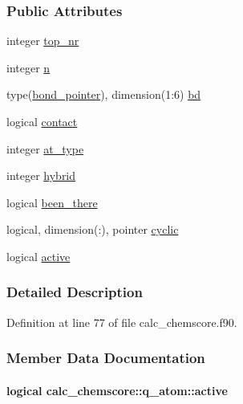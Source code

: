 \subsubsection*{Public Attributes}
\begin{DoxyCompactItemize}
\item 
integer \hyperlink{structcalc__chemscore_1_1q__atom_a45781d30e4d6635063993f5cc255f0d5}{top\-\_\-nr}
\item 
integer \hyperlink{structcalc__chemscore_1_1q__atom_a278aca77377ccabcd177be060a8a4c44}{n}
\item 
type(\hyperlink{structcalc__chemscore_1_1bond__pointer}{bond\-\_\-pointer}), dimension(1\-:6) \hyperlink{structcalc__chemscore_1_1q__atom_ab8271d5ededd6c275ae76897c65a1655}{bd}
\item 
logical \hyperlink{structcalc__chemscore_1_1q__atom_aa8b0c72fdf2f0bb5c4485f5af46abbfc}{contact}
\item 
integer \hyperlink{structcalc__chemscore_1_1q__atom_a53f533a342d764a9ed38a4e5929bdb70}{at\-\_\-type}
\item 
integer \hyperlink{structcalc__chemscore_1_1q__atom_a88f13993f1131b735ed1b57383871484}{hybrid}
\item 
logical \hyperlink{structcalc__chemscore_1_1q__atom_af47778363b2675c3ccb7992cafd5b448}{been\-\_\-there}
\item 
logical, dimension(\-:), pointer \hyperlink{structcalc__chemscore_1_1q__atom_aae893d503a84fb04f0063651d4b32012}{cyclic}
\item 
logical \hyperlink{structcalc__chemscore_1_1q__atom_a8ea40a20405d4aa8b1b03cf478d985da}{active}
\end{DoxyCompactItemize}


\subsubsection{Detailed Description}


Definition at line 77 of file calc\-\_\-chemscore.\-f90.



\subsubsection{Member Data Documentation}
\hypertarget{structcalc__chemscore_1_1q__atom_a8ea40a20405d4aa8b1b03cf478d985da}{
\paragraph[{active}]{\setlength{\rightskip}{0pt plus 5cm}logical calc\-\_\-chemscore\-::q\-\_\-atom\-::active}}\label{structcalc__chemscore_1_1q__atom_a8ea40a20405d4aa8b1b03cf478d985da}


